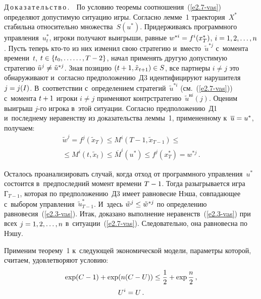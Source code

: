 \begin{multicols}{2}
\smallskip

\noindent
    Д\,о\,к\,а\,з\,а\,т\,е\,л\,ь\,с\,т\,в\,о\,.\ \ По условию теоремы 
соотношения~(\ref{e2.7-vas}) определяют допустимую ситуацию игры. Согласно 
лемме~1 траектория~$X^*$ стабильна относительно множества~$S(u^*)$. 
Придерживаясь программного управления~$u_t^*$, игроки получают выигрыши, 
равные $w^{*i}\hm= f^i(x^*_T)$, $i\hm=1, 2,\ldots , n$. Пусть теперь кто-то из них 
изменил свою стратегию и~вмес\-то~$\tilde{u}^{*j}$ с~момента времени~$t$, 
$t\hm\in \{t_0,\ldots\linebreak
\ldots , T\hm-2\}$, начал применять другую допустимую стратегию 
$\tilde{u}^j\hm\not= \tilde{u}^{*j}$. Зная позицию $(t+1, \tilde{x}_{t+1})\hm\in S$, 
все партнеры $i\not= j$ это обнаруживают и~согласно предположению~Д3 
идентифицируют нарушителя $j\hm=j(I)$. В~соответствии с~определением 
стратегий~$\tilde{u}^{*i}$ (см.~(\ref{e2.7-vas})) с~момента $t\hm+1$ игроки $i\not= 
j$ применяют контрстратегию~$\tilde{u}^{\mathrm{н}i}(j)$. Оценим выигрыш  
$j$-го игрока в~этой ситуации. Согласно предположению~Д1 и~последнему 
неравенству из доказательства леммы~1, примененному к~$\overline{u}\hm= u^*$, 
получаем:
   \begin{multline*}
    \tilde{w}^j =f^j(\tilde{x}_T)\leq M^i(T-1,\tilde{x}_{T-1})\leq{}\\
    {}\leq M^i(t,\tilde{x}_t) 
\leq \overline{M}^i(u^*)\leq f^j(x_T^*)=w^{*j}\,.
    \end{multline*}
     
    Осталось проанализировать случай, когда отход от программного 
управления~$u^*$ состоится в~предпоследний момент времени $T\hm-1$. Тогда 
разыгрывается игра~$\mathrm{Г}_{T-1}$, которая по предположению~Д3 имеет 
равновесие Нэша, совпадающее с~выбором управления~$\tilde{u}^*_{T-1}$. 
И~здесь $\tilde{w}^j\hm\leq \tilde{w}^{*j}$ по определению  
равновесия~(\ref{e2.3-vas}). Итак, доказано выполнение неравенств~(\ref{e2.3-vas}) 
при всех $j\hm= 1,2,\ldots ,n$ в~ситуации~(\ref{e2.7-vas}). Следовательно, она 
равновесна по Нэшу.
    
    \smallskip
    
    Применим теорему~1 к~следующей экономической модели, параметры 
которой, считаем, удовле\-тво\-ря\-ют условию:
    \begin{multline}
    \exp (C-1) +\exp (n(C-U))\leq \displaystyle\frac{\displaystyle 1\mathstrut}{\displaystyle 2\mathstrut}+\exp \displaystyle\frac{\displaystyle n\mathstrut}{\displaystyle 2\mathstrut}\,,\\ U^i=U\,.
    \label{e2.8-vas}
    \end{multline}
     

\end{multicols}
